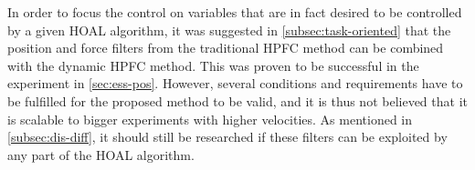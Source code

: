 In order to focus the control on variables that are in fact desired to be controlled by a given HOAL algorithm, it was suggested in \ref{subsec:task-oriented} that the position and force filters from the traditional HPFC method can be combined with the dynamic HPFC method. This was proven to be successful in the experiment in \ref{sec:ess-pos}. However, several conditions and requirements have to be fulfilled for the proposed method to be valid, and it is thus not believed that it is scalable to bigger experiments with higher velocities. As mentioned in \ref{subsec:dis-diff}, it should still be researched if these filters can be exploited by any part of the HOAL algorithm.

